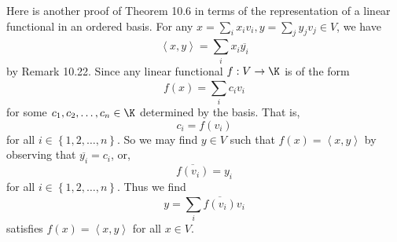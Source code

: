\documentclass[linearalgebra]{subfiles}
\begin{document}
    \begin{remark}
        Here is another proof of Theorem 10.6 in terms of the representation of a linear functional in an ordered basis. For any $x=\sum^{}_{i} x_iv_i, y=\sum^{}_{j} y_jv_j\in V$, we have
        \begin{equation*}
            \left\langle x, y\right\rangle = \sum^{}_{i} x_i \overline{y_i}
        \end{equation*}
        by Remark 10.22. Since any linear functional $f:V\to\K$ is of the form
        \begin{equation*}
            f(x) = \sum^{}_{i} c_iv_i
        \end{equation*}
        for some $c_1,c_2,\ldots,c_n\in\K$ determined by the basis. That is,
        \begin{equation*}
            c_i = f\left( v_i \right) 
        \end{equation*}
        for all $i\in\left\lbrace 1,2,\ldots,n \right\rbrace$. So we may find $y\in V$ such that $f(x) = \left\langle x, y\right\rangle$ by observing that $\overline{y_i} = c_i$, or,
        \begin{equation*}
            \overline{f\left( v_i \right) } = y_i
        \end{equation*}
        for all $i\in \left\lbrace 1,2,\ldots,n \right\rbrace$. Thus we find
        \begin{equation*}
            y = \sum^{}_{i} \overline{f\left( v_i \right) }v_i
        \end{equation*}
        satisfies $f(x) = \left\langle x, y\right\rangle$ for all $x\in V$.
    \end{remark}
\end{document}
